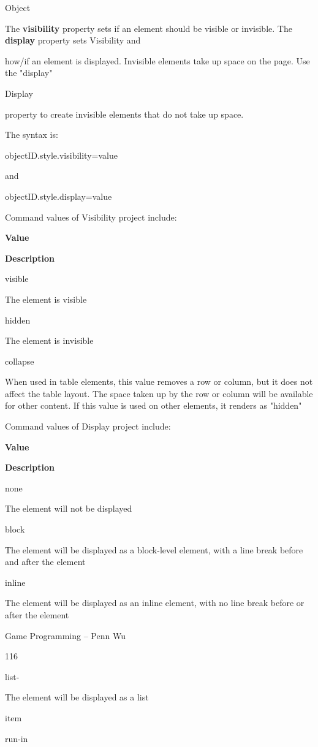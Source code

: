 \documentclass[
]{article}
\begin{document}
Object

The \textbf{visibility} property sets if an element should be visible or
invisible. The \textbf{display} property sets Visibility and

how/if an element is displayed. Invisible elements take up space on the
page. Use the "display"

Display

property to create invisible elements that do not take up space.

The syntax is:

objectID.style.visibility=value

and

objectID.style.display=value

Command values of Visibility project include:

\textbf{Value}

\textbf{Description}

visible

The element is visible

hidden

The element is invisible

collapse

When used in table elements, this value removes a row or column, but it
does not affect the table layout. The space taken up by the row or
column will be available for other content. If this value is used on
other elements, it renders as "hidden"

Command values of Display project include:

\textbf{Value}

\textbf{Description}

none

The element will not be displayed

block

The element will be displayed as a block-level element, with a line
break before and after the element

inline

The element will be displayed as an inline element, with no line break
before or after the element

Game Programming -- Penn Wu

116

\protect\hypertarget{index_split_008.htmlux5cux23p117}{}{}list-

The element will be displayed as a list

item

run-in
\end{document}

